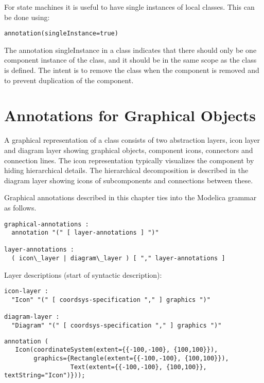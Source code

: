 For state machines it is useful to have single instances of local
classes. This can be done using:
\begin{lstlisting}[language=modelica]
annotation(singleInstance=true)
\end{lstlisting}

The annotation singleInstance in a class indicates that there should
only be one component instance of the class, and it should be in the
same scope as the class is defined. The intent is to remove the class
when the component is removed and to prevent duplication of the
component.

\section{Annotations for Graphical Objects}\label{annotations-for-graphical-objects}

A graphical representation of a class consists of two abstraction
layers, icon layer and diagram layer showing graphical objects,
component icons, connectors and connection lines. The icon
representation typically visualizes the component by hiding hierarchical
details. The hierarchical decomposition is described in the diagram
layer showing icons of subcomponents and connections between these.

Graphical annotations described in this chapter ties into the Modelica
grammar as follows.
\begin{lstlisting}[language=grammar]
graphical-annotations :
  annotation "(" [ layer-annotations ] ")"

layer-annotations :
  ( icon\_layer | diagram\_layer ) [ "," layer-annotations ]
\end{lstlisting}
Layer descriptions (start of syntactic description):
\begin{lstlisting}[language=grammar]
icon-layer :
  "Icon" "(" [ coordsys-specification "," ] graphics ")"

diagram-layer :
  "Diagram" "(" [ coordsys-specification "," ] graphics ")"
\end{lstlisting}

\begin{example}
\begin{lstlisting}[language=modelica]
annotation (
   Icon(coordinateSystem(extent={{-100,-100}, {100,100}}),
        graphics={Rectangle(extent={{-100,-100}, {100,100}}),
                  Text(extent={{-100,-100}, {100,100}}, textString="Icon")}));
\end{lstlisting}
\end{example}

